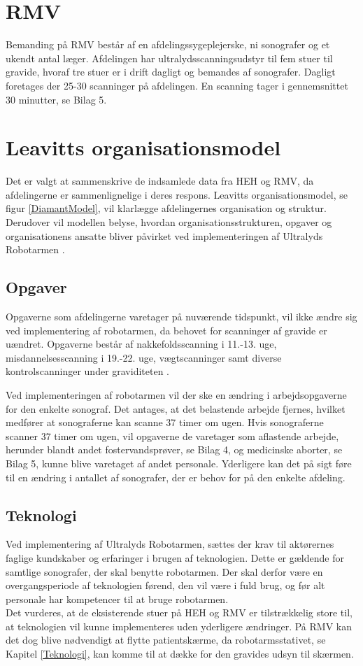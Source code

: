 \section{RMV}
Bemanding på RMV består af en afdelingssygeplejerske, ni sonografer og et ukendt antal læger. Afdelingen har ultralydsscanningsudstyr til fem stuer til gravide, hvoraf tre stuer er i drift dagligt og bemandes af sonografer. Dagligt foretages der 25-30 scanninger på afdelingen. En scanning tager i gennemsnittet 30 minutter, se Bilag 5.

\section{Leavitts organisationsmodel}
Det er valgt at sammenskrive de indsamlede data fra HEH og RMV, da afdelingerne er sammenlignelige i deres respons. Leavitts organisationsmodel, se figur \ref*{DiamantModel}, vil klarlægge afdelingernes organisation og struktur. Derudover vil modellen belyse, hvordan organisationsstrukturen, opgaver og organisationens ansatte bliver påvirket ved implementeringen af Ultralyds Robotarmen \cite{Leavitt}\cite{diamantmodel}. 

\subsection{Opgaver} \label{opgaver_organisation}
Opgaverne som afdelingerne varetager på nuværende tidspunkt, vil ikke ændre sig ved implementering af robotarmen, da behovet for scanninger af gravide er uændret. Opgaverne består af nakkefoldsscanning i 11.-13. uge, misdannelsesscanning i 19.-22. uge, vægtscanninger samt diverse kontrolscanninger under graviditeten \cite{graviditet}. 

Ved implementeringen af robotarmen vil der ske en ændring i arbejdsopgaverne for den enkelte sonograf. Det antages, at det belastende arbejde fjernes, hvilket medfører at sonograferne kan scanne 37 timer om ugen. Hvis sonograferne scanner 37 timer om ugen, vil opgaverne de varetager som aflastende arbejde, herunder blandt andet fostervandsprøver, se Bilag 4, og medicinske aborter, se Bilag 5, kunne blive varetaget af andet personale. Yderligere kan det på sigt føre til en ændring i antallet af sonografer, der er behov for på den enkelte afdeling. 

\subsection{Teknologi}
Ved implementering af Ultralyds Robotarmen, sættes der krav til aktørernes faglige kundskaber og erfaringer i brugen af teknologien. Dette er gældende for samtlige sonografer, der skal benytte robotarmen. Der skal derfor være en overgangsperiode af teknologien førend, den vil være i fuld brug, og før alt personale har kompetencer til at bruge robotarmen. \\
Det vurderes, at de eksisterende stuer på HEH og RMV er tilstrækkelig store til, at teknologien vil kunne implementeres uden yderligere ændringer. På RMV kan det dog blive nødvendigt at flytte patientskærme, da robotarmsstativet, se Kapitel \ref{Teknologi}, kan komme til at dække for den gravides udsyn til skærmen.  

